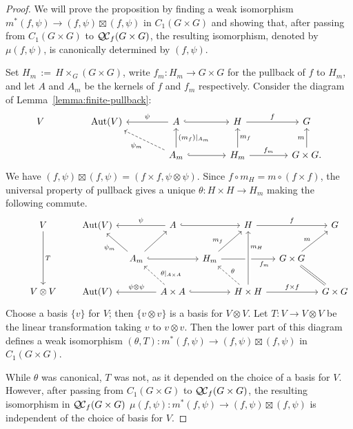 \documentclass[11pt]{amsart}
\theoremstyle{plain}
\theoremstyle{definition}
\theoremstyle{remark}
\DeclareMathOperator{\Aut}{Aut}
\newcommand{\ceq}{{\, :=\, }}
\newcommand{\QC}{{\mathcal{Q\hskip-0.8pt C}}}
\newcommand{\QCf}{{\QC_f}}
\begin{document}
\begin{proof}
We will prove the proposition by finding a weak isomorphism 
$m^*(f,\psi) \to (f,\psi)\boxtimes (f,\psi)$ in $C_1(G\times G)$ 
and showing that, after passing from $C_1(G\times G)$ to 
$\QCf(G\times G)$, the resulting isomorphism, 
denoted by $\mu(f,\psi)$, is canonically determined by $(f,\psi)$.

Set $H_m \ceq H\times_G(G\times G)$, 
write $f_m : H_m \to G \times G$ for the pullback of $f$ to $H_m$, 
and let $A$ and $A_m$ be the kernels of $f$ and $f_m$ respectively.  Consider the diagram of Lemma~\ref{lemma:finite-pullback}:
\[
\begin{tikzcd}[column sep=40]
V & \Aut(V) & \arrow[swap]{l}{\psi} A \arrow[hook]{r} & H \arrow{r}{f} &  G\\
  &  & \arrow[dashed]{ul}{\psi_m} \arrow[swap]{u}{(m_f)\vert_{A_m}} A_m \arrow[hook]{r}
  & \arrow[swap]{u}{m_f} H_m \arrow{r}{f_m} & \arrow{u}{m} G\times G.
\end{tikzcd}
\]
We have $(f,\psi) \boxtimes (f,\psi) = (f\times f, \psi\otimes \psi)$.
Since $f\circ m_H = m \circ (f\times f)$, the universal property of pullback gives
a unique $\theta : H\times H \to H_m$ making the following commute.
\[
\begin{tikzcd}[row sep=20,column sep=10]
\ & V \arrow{dd}{T} && \Aut(V) && A \arrow[hook]{rr} \arrow[swap]{ll}{\psi} &&  H \arrow{rr}{f} && G\\
 && && \arrow{ul}{\psi_m} A_m  \arrow[hook]{rr} \arrow{ur} && H_m \arrow[pos=0.3]{ur}{m_f} \arrow[swap, pos=0.8]{rr}{f_m}
 && G \times G \arrow[equal]{dr} \arrow[pos=0.42]{ur}{m} & \\
& V\otimes V && \Aut(V) && \arrow[swap]{ll}{\psi \otimes \psi} \arrow[dashed,swap,pos=0.3]{ul}{\theta\vert_{A\times A}} A\times A \arrow[hook]{rr}
&& \arrow[dashed,swap]{ul}{\theta} \arrow[crossing over,swap,pos=0.7]{uu}{m_H} H\times H \arrow{rr}{f\times f} && G\times G
\end{tikzcd}
\]
Choose a basis $\{ v \}$ for $V$; then $\{ v\otimes v \}$ is a basis for $V\otimes V$.
Let $T : V \to V\otimes V$ be the linear transformation taking $v$ to $v\otimes v$. Then the lower part of this
diagram defines a weak isomorphism $(\theta,T): m^*(f,\psi) \to (f,\psi)\boxtimes (f,\psi)$  in $C_1(G\times G)$. 

While $\theta$ was canonical, $T$ was not, as it depended on the choice of a basis for $V$.
However, after passing from $C_1(G\times G)$ to $\QCf(G\times G)$, the resulting isomorphism in $\QCf(G\times G)$
$\mu(f,\psi): m^*(f,\psi) \to (f,\psi)\boxtimes (f,\psi)$ is independent of the choice of basis for $V$.
 \end{proof}
\end{document}
